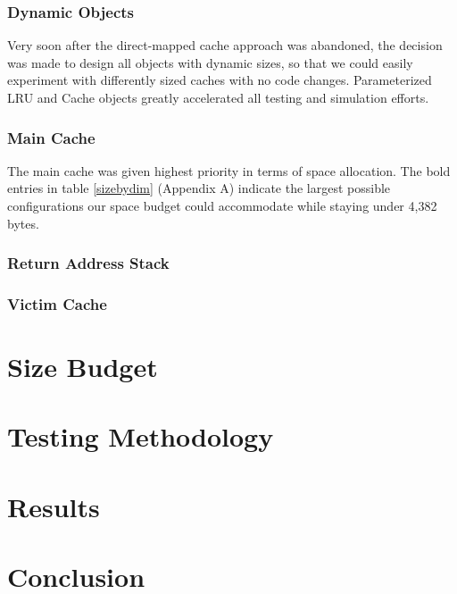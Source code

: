 \documentclass[twocolumn]{article}
\begin{document}
\subsubsection{Dynamic Objects}
Very soon after the direct-mapped cache approach was abandoned, the decision was made to design all objects with dynamic sizes, so that we could easily experiment with differently sized caches with no code changes.  Parameterized LRU and Cache objects greatly accelerated all testing and simulation efforts. 
\subsubsection{Main Cache}
The main cache was given highest priority in terms of space allocation.  The bold entries in table \ref{sizebydim} (Appendix A) indicate the largest possible configurations our space budget could accommodate while staying under 4,382 bytes.

\subsubsection{Return Address Stack}
\subsubsection{Victim Cache}
\section{Size Budget}
\section{Testing Methodology}
\section{Results}
\section{Conclusion}
\appendix
\onecolumn
\end{document}
